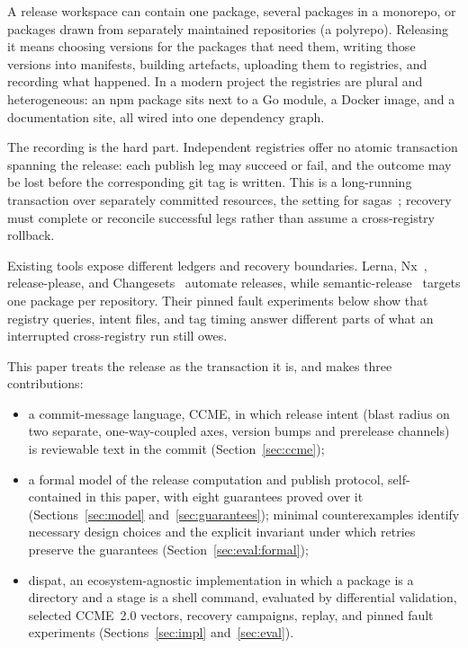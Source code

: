 \documentclass[10pt,conference]{IEEEtran}
\theoremstyle{definition}
\begin{document}
A release workspace can contain one package, several packages in a monorepo,
or packages drawn from separately maintained repositories (a polyrepo).
Releasing it means choosing versions for the packages that need them,
writing those versions into manifests, building artefacts,
uploading them to registries, and recording what happened. In a modern
project the registries are plural and heterogeneous: an npm package sits
next to a Go module, a Docker image, and a documentation site, all wired
into one dependency graph.

The recording is the hard part. Independent registries offer no atomic
transaction spanning the release: each publish leg may succeed or fail, and
the outcome may be lost before the corresponding git tag is written. This is
a long-running transaction over separately committed resources, the setting
for sagas~\cite{sagas}; recovery must complete or reconcile successful legs
rather than assume a cross-registry rollback.

Existing tools expose different ledgers and recovery boundaries. Lerna,
Nx~\cite{nx}, release-please, and Changesets~\cite{changesets} automate
releases, while semantic-release~\cite{semanticrelease} targets one package
per repository. Their pinned fault experiments below show that registry
queries, intent files, and tag timing answer different parts of what an
interrupted cross-registry run still owes.

This paper treats the release as the transaction it is, and makes three
contributions:
\begin{itemize}
  \item a commit-message language, CCME, in which release intent
    (blast radius on two separate, one-way-coupled axes, version bumps and
    prerelease channels) is reviewable text in the commit
    (Section~\ref{sec:ccme});
  \item a formal model of the release computation and publish protocol,
    self-contained in this paper, with eight guarantees proved over it
    (Sections~\ref{sec:model} and~\ref{sec:guarantees}); minimal counterexamples identify necessary design choices and
    the explicit invariant under which retries preserve the guarantees
    (Section~\ref{sec:eval:formal});
  \item dispat, an ecosystem-agnostic implementation in which a package is
    a directory and a stage is a shell command, evaluated by differential
    validation, selected CCME~2.0 vectors, recovery campaigns, replay, and
    pinned fault experiments (Sections~\ref{sec:impl} and~\ref{sec:eval}).
\end{itemize}
\end{document}
